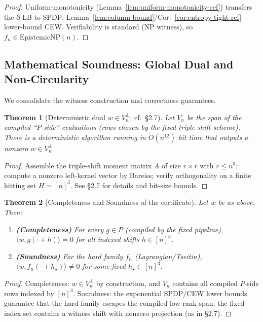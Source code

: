\documentclass[12pt]{article}
\newtheorem{theorem}{Theorem}
\theoremstyle{definition}
\theoremstyle{definition}
\theoremstyle{remark}
\theoremstyle{remark}
\begin{document}
\begin{proof}
Uniform-monotonicity (Lemma~\ref{lem:uniform-monotonicity-ref}) transfers the $\partial$-LB to SPDP; Lemma~\ref{lem:column-bound}/Cor.~\ref{cor:entropy-tight-ref} lower-bound CEW. Verifiability is standard (NP witness), so $f_n\in\mathrm{EpistemicNP}(n)$.
\end{proof}

\subsection{Mathematical Soundness: Global Dual and Non-Circularity}

We consolidate the witness construction and correctness guarantees.

\begin{theorem}[Deterministic dual $w\in V_n^{\perp}$; cf.\ \S2.7]\label{thm:deterministic-dual-ref}
Let $V_n$ be the span of the compiled ``$P$-side'' evaluations (rows chosen by the fixed triple-shift scheme). There is a deterministic algorithm running in $\tilde O(n^{12})$ bit time that outputs a nonzero $w\in V_n^{\perp}$.
\end{theorem}

\begin{proof}
Assemble the triple-shift moment matrix $A$ of size $r\times r$ with $r\le n^3$; compute a nonzero left-kernel vector by Bareiss; verify orthogonality on a finite hitting set $H=[n]^3$. See \S2.7 for details and bit-size bounds.
\end{proof}

\begin{theorem}[Completeness and Soundness of the certificate]\label{thm:cert-completeness-soundness}
Let $w$ be as above. Then:

\begin{enumerate}
\item \textbf{(Completeness)} For every $g\in P$ (compiled by the fixed pipeline), $\langle w, g(\cdot+h)\rangle=0$ for all indexed shifts $h\in[n]^3$.

\item \textbf{(Soundness)} For the hard family $f_n$ (Lagrangian/Tseitin), $\langle w, f_n(\cdot+h_\star)\rangle\neq 0$ for some fixed $h_\star\in[n]^3$.
\end{enumerate}
\end{theorem}

\begin{proof}
Completeness: $w\in V_n^{\perp}$ by construction, and $V_n$ contains all compiled $P$-side rows indexed by $[n]^3$. Soundness: the exponential SPDP/CEW lower bounds guarantee that the hard family escapes the compiled low-rank span; the fixed index set contains a witness shift with nonzero projection (as in \S2.7).
\end{proof}
\end{document}
